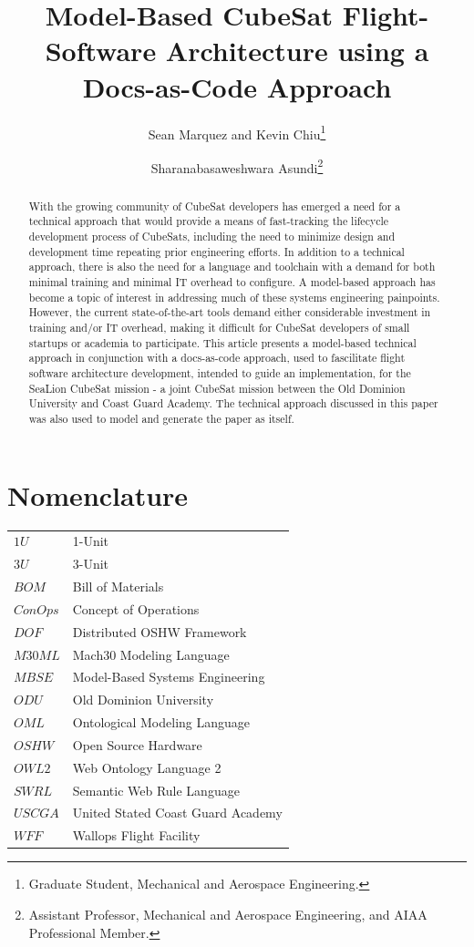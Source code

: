 \documentclass[conf]{new-aiaa}
\title{Model-Based CubeSat Flight-Software Architecture using a Docs-as-Code Approach}
\author{Sean Marquez and Kevin Chiu\footnote{Graduate Student, Mechanical and Aerospace Engineering.} }
\affil{Old Dominion University, Norfolk, VA, 23529, USA}
\author{Sharanabasaweshwara Asundi\footnote{Assistant Professor, Mechanical and Aerospace Engineering, and AIAA Professional Member.} }
\affil{Old Dominion University, Norfolk, VA, 23529, USA}
\begin{document}
\maketitle

\begin{abstract}
With the growing community of CubeSat developers has emerged a need for a technical approach that would provide a means of fast-tracking the lifecycle development process of CubeSats, including the need to minimize design and development time repeating prior engineering efforts. In addition to a technical approach, there is also the need for a language and toolchain with a demand for both minimal training and minimal IT overhead to configure. A model-based approach has become a topic of interest in addressing much of these systems engineering painpoints. However, the current state-of-the-art tools demand either considerable investment in training and/or IT overhead, making it difficult for CubeSat developers of small startups or academia to participate. This article presents a model-based technical approach in conjunction with a docs-as-code approach, used to fascilitate flight software architecture development, intended to guide an implementation, for the SeaLion CubeSat mission - a joint CubeSat mission between the Old Dominion University and Coast Guard Academy. The technical approach discussed in this paper was also used to model and generate the paper as itself.

\end{abstract}


\section{Nomenclature}

\begin{center}
{\renewcommand\arraystretch{1.0}
\noindent\begin{longtable*}{@{}l @{\quad=\quad} l@{}}
$1U$ & 1-Unit \\
$3U$ & 3-Unit \\
$BOM$  & Bill of Materials \\
$ConOps$  & Concept of Operations \\
$DOF$  & Distributed OSHW Framework  \\
$M30ML$  & Mach30 Modeling Language \\
$MBSE$ & Model-Based Systems Engineering  \\
$ODU$ & Old Dominion University \\
$OML$  & Ontological Modeling Language \\
$OSHW$ & Open Source Hardware \\
$OWL2$ & Web Ontology Language 2 \\
$SWRL$ & Semantic Web Rule Language \\
$USCGA$ & United Stated Coast Guard Academy \\
$WFF$   & Wallops Flight Facility  
\end{longtable*}}
\end{center}
\end{document}

